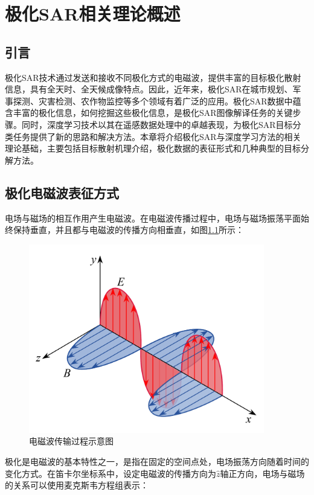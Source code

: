 \chapter{极化SAR相关理论概述}
\section{引言}
极化SAR技术通过发送和接收不同极化方式的电磁波，提供丰富的目标极化散射信息，具有全天时、全天候成像特点。因此，近年来，极化SAR在城市规划、军事探测、灾害检测、农作物监控等多个领域有着广泛的应用。极化SAR数据中蕴含丰富的极化信息，如何挖掘这些极化信息，是极化SAR图像解译任务的关键步骤。同时，深度学习技术以其在遥感数据处理中的卓越表现，为极化SAR目标分类任务提供了新的思路和解决方法。本章将介绍极化SAR与深度学习方法的相关理论基础，主要包括目标散射机理介绍，极化数据的表征形式和几种典型的目标分解方法。

\section{极化电磁波表征方式}
电场与磁场的相互作用产生电磁波。在电磁波传播过程中，电场与磁场振荡平面始终保持垂直，并且都与电磁波的传播方向相垂直，如图\ref{电磁波传输过程示意图}所示：

\begin{figure}[h]
    \includegraphics[width=10.3cm]{pic/chapter2/电磁波传输过程.pdf}
    \caption{电磁波传输过程示意图}
    \label{电磁波传输过程示意图}
\end{figure}

极化是电磁波的基本特性之一，是指在固定的空间点处，电场振荡方向随着时间的变化方式。在笛卡尔坐标系中，设定电磁波的传播方向为$\hat{z}$轴正方向，电场与磁场的关系可以使用麦克斯韦方程组表示：

